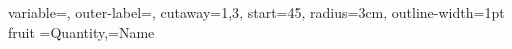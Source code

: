 \documentclass[12pt]{article}
\begin{document}
\DTLpiechart
{
 variable=\Quantity,
 outer-label=\Name,
 cutaway={1,3},
 start=45,
 radius=3cm,
 outline-width=1pt
}
{fruit}%
{\Quantity=Quantity,\Name=Name}%
 
\end{document}
